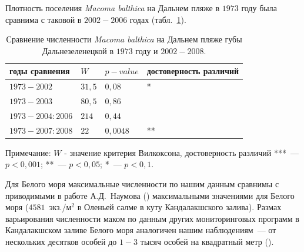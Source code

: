 Плотность поселения {\it Macoma balthica} на Дальнем пляже в $1973$ году была сравнима с таковой в $2002-2006$ годах (табл.~\ref{tab:DZ_N_1973_sravnenie}).
	\begin{table}[p]
	\begin{tabularx}{\textwidth}{|*{4}{X|}} \hline
	годы сравнения & $W$ & $p-value$ & достоверность различий \\ 
	\hline
	$1973 - 2002$ & $31,5$ & $0,08$ & *\\
	\hline
	$1973 - 2003$ & $80,5$ & $0,86$ & \\
	\hline
	$1973 - 2004:2006$ &  $214$ & $0,44$ & \\
	\hline
	$1973 - 2007:2008$ & $22$ & $0,0048$ & ** \\
	\hline
	\end{tabularx}
	{\footnotesize Примечание: $W$ - значение критерия Вилкоксона, достоверность различий ***~--- $p<0,001$; **~--- $p<0,05$; *~--- $p<0,1$.}
	\caption{Сравнение численности {\it Macoma balthica} на Дальнем пляже губы Дальнезеленецкой в $1973$ году и $2002-2008$.}
	\label{tab:DZ_N_1973_sravnenie}
	\end{table}


Для Белого моря максимальные численности по нашим данным сравнимы с приводимыми в работе А.Д.~Наумова (\cite{Naumov_2006}) максимальными значениями для Белого моря ($4581$~экз./м$^2$ в Оленьей салме в куту Кандалакшского залива). 
Размах варьирования численности маком по данным других мониторинговых программ в Кандалакшском заливе Белого моря аналогичен нашим наблюдениям~--- от нескольких десятков особей до $1-3$ тысяч особей на квадратный метр (\cite{Semenova_1974, Maximovich_et_al_1991, Varfolomeeva_Naumov_2013}). 




